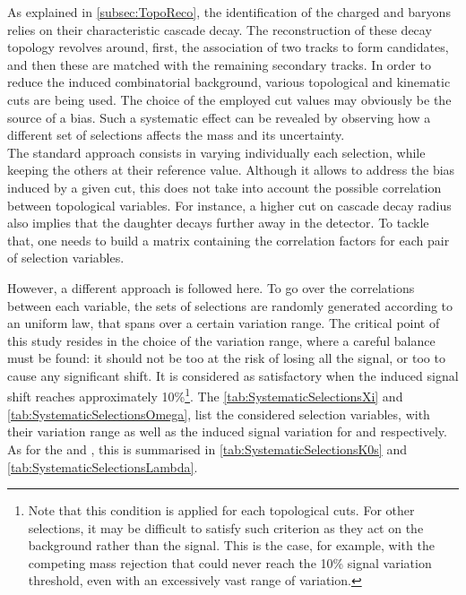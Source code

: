 As explained in \Sec\ref{subsec:TopoReco}, the identification of the charged \rmXi and \rmOmega baryons relies on their characteristic cascade decay. The reconstruction of these decay topology revolves around, first, the association of two tracks to form \rmLambda candidates, and then these are matched with the remaining secondary tracks. In order to reduce the induced combinatorial background, various topological and kinematic cuts are being used. The choice of the employed cut values may obviously be the source of a bias. Such a systematic effect can be revealed by observing how a different set of selections affects the mass and its uncertainty.\\

The standard approach consists in varying individually each selection, while keeping the others at their reference value. Although it allows to address the bias induced by a given cut, this does not take into account the possible correlation between topological variables. For instance, a higher cut on cascade decay radius also implies that the \rmLambda daughter decays further away in the detector. To tackle that, one needs to build a matrix containing the correlation factors for each pair of selection variables.

However, a different approach is followed here. To go over the correlations between each variable, the sets of selections are randomly generated according to an uniform law, that spans over a certain variation range. The critical point of this study resides in the choice of the variation range, where a careful balance must be found: it should not be too  at the risk of losing all the signal, or too  to cause any significant shift. It is considered as satisfactory when the induced signal shift reaches approximately 10\%\footnote{Note that this condition is applied for each topological cuts. For other selections, it may be difficult to satisfy such criterion as they act on the background rather than the signal. This is the case, for example, with the competing mass rejection that could never reach the 10\% signal variation threshold, even with an excessively vast range of variation.}. The \tabs\ref{tab:SystematicSelectionsXi} and \ref{tab:SystematicSelectionsOmega}, list the considered selection variables, with their variation range as well as the induced signal variation for \rmXi and \rmOmega respectively. As for the \rmKzeroS and \rmLambda, this is summarised in \tabs\ref{tab:SystematicSelectionsK0s} and \ref{tab:SystematicSelectionsLambda}. \\

